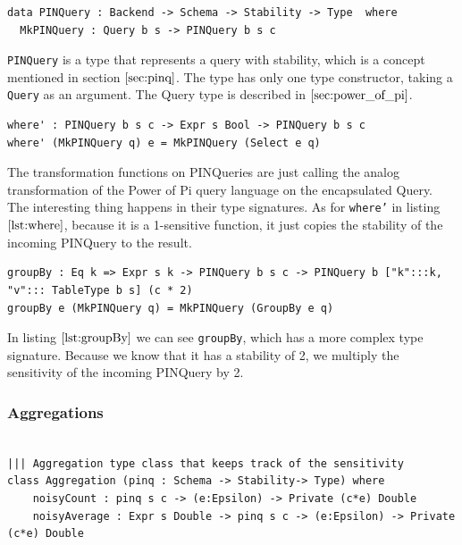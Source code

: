 \documentclass[12pt]{article}
\begin{document}
\begin{lstlisting}[label={lst:pinquery},caption=PINQuery - wrapper around Query]
data PINQuery : Backend -> Schema -> Stability -> Type  where
  MkPINQuery : Query b s -> PINQuery b s c
\end{lstlisting}

\texttt{PINQuery} is a type that represents a query with stability, which is a concept mentioned in section $\ref{sec:pinq}$. 
The type has only one type constructor, taking a \texttt{Query} as an argument. The Query type is described in $\ref{sec:power_of_pi}$.

\begin{lstlisting}[label={lst:where},caption=Selection on PINQuery]
where' : PINQuery b s c -> Expr s Bool -> PINQuery b s c
where' (MkPINQuery q) e = MkPINQuery (Select e q)
\end{lstlisting}

The transformation functions on PINQueries are just calling the analog transformation of the Power of Pi query language on the encapsulated Query.
The interesting thing happens in their type signatures. 
As for \texttt{where'} in listing $\ref{lst:where}$, because it is a 1-sensitive function, it just copies the stability of the incoming PINQuery to the result.


\begin{lstlisting}[label={lst:groupBy},caption=groupBy]
groupBy : Eq k => Expr s k -> PINQuery b s c -> PINQuery b ["k":::k, "v"::: TableType b s] (c * 2)
groupBy e (MkPINQuery q) = MkPINQuery (GroupBy e q)
\end{lstlisting}

In listing $\ref{lst:groupBy}$ we can see \texttt{groupBy}, which has a more complex type signature.
Because we know that it has a stability of 2, we multiply the sensitivity of the incoming PINQuery by 2.



\subsubsection{Aggregations}\label{sec:pinq:aggregations}






\begin{lstlisting}[label={lst:aggregation},caption=Aggregation type class]

||| Aggregation type class that keeps track of the sensitivity
class Aggregation (pinq : Schema -> Stability-> Type) where
    noisyCount : pinq s c -> (e:Epsilon) -> Private (c*e) Double
    noisyAverage : Expr s Double -> pinq s c -> (e:Epsilon) -> Private (c*e) Double
\end{lstlisting}
\end{document}
